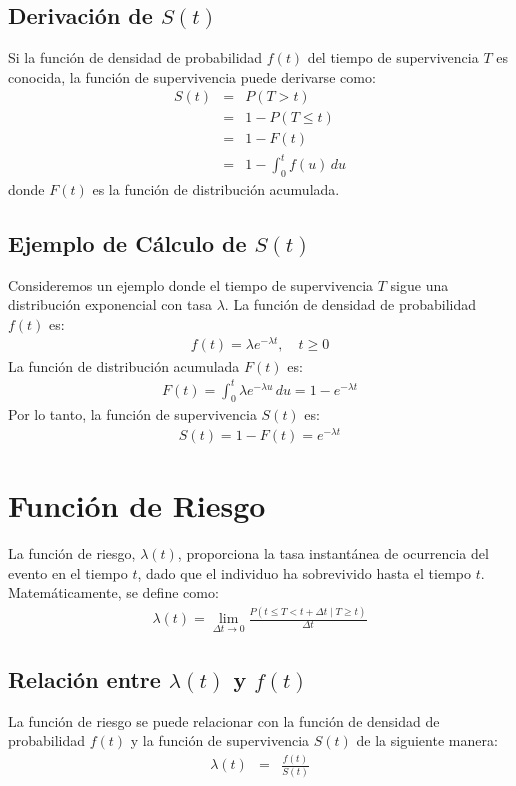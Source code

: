 \documentclass[a4paper]{report} %
\begin{document}
\subsection{Derivaci\'on de $S(t)$}
Si la funci\'on de densidad de probabilidad $f(t)$ del tiempo de supervivencia $T$ es conocida, la funci\'on de supervivencia puede derivarse como:
\begin{eqnarray*}
S(t) &=& P(T > t) \\
     &=& 1 - P(T \leq t) \\
     &=& 1 - F(t) \\
     &=& 1 - \int_0^t f(u) \, du
\end{eqnarray*}
donde $F(t)$ es la funci\'on de distribuci\'on acumulada.

\subsection{Ejemplo de C\'alculo de $S(t)$}
Consideremos un ejemplo donde el tiempo de supervivencia $T$ sigue una distribuci\'on exponencial con tasa $\lambda$. La funci\'on de densidad de probabilidad $f(t)$ es:
\begin{eqnarray*}
f(t) = \lambda e^{-\lambda t}, \quad t \geq 0
\end{eqnarray*}
La funci\'on de distribuci\'on acumulada $F(t)$ es:
\begin{eqnarray*}
F(t) = \int_0^t \lambda e^{-\lambda u} \, du = 1 - e^{-\lambda t}
\end{eqnarray*}
Por lo tanto, la funci\'on de supervivencia $S(t)$ es:
\begin{eqnarray*}
S(t) = 1 - F(t) = e^{-\lambda t}
\end{eqnarray*}

\section{Funci\'on de Riesgo}
La funci\'on de riesgo, $\lambda(t)$, proporciona la tasa instant\'anea de ocurrencia del evento en el tiempo $t$, dado que el individuo ha sobrevivido hasta el tiempo $t$. Matem\'aticamente, se define como:
\begin{eqnarray*}
\lambda(t) = \lim_{\Delta t \to 0} \frac{P(t \leq T < t + \Delta t \mid T \geq t)}{\Delta t}
\end{eqnarray*}

\subsection{Relaci\'on entre $\lambda(t)$ y $f(t)$}
La funci\'on de riesgo se puede relacionar con la funci\'on de densidad de probabilidad $f(t)$ y la funci\'on de supervivencia $S(t)$ de la siguiente manera:
\begin{eqnarray*}
\lambda(t) &=& \frac{f(t)}{S(t)}
\end{eqnarray*}
\end{document}
